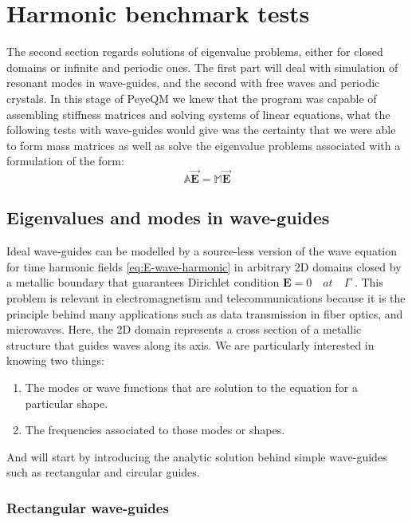 \section{Harmonic benchmark tests}
The second section regards solutions of eigenvalue problems, either for closed domains or infinite and periodic ones. The first part will deal with simulation of resonant modes in wave-guides, and the second with free waves and periodic crystals.
In this stage of PeyeQM we knew that the program was capable of assembling stiffness matrices and solving systems of linear equations, what the following tests with wave-guides would give was the certainty that we were able to form mass matrices as well  as solve the eigenvalue problems associated with a formulation of the form:
\[\mathbb{A}\mathbf{\vec{E}} = \mathbb{M}\mathbf{\vec{E}}\]


\subsection{Eigenvalues and modes in wave-guides}

Ideal wave-guides can be modelled by a source-less version of the wave equation for time harmonic fields \ref{eq:E-wave-harmonic} in arbitrary 2D domains closed by a metallic boundary that guarantees Dirichlet condition $\mathbf{E} = 0\quad at\quad \Gamma$ . This problem is relevant in electromagnetism and telecommunications because it is the principle behind many applications such as data transmission in fiber optics, and microwaves. Here, the 2D domain represents a cross section of a metallic structure that guides waves along its axis. We are particularly interested in knowing two things:
\begin{enumerate}
\item The modes or wave functions that are solution to the equation for a particular shape.
\item The frequencies associated to those modes or shapes. 
\end{enumerate}
And will start by introducing the analytic solution behind simple wave-guides such as rectangular and circular guides.

\subsubsection{Rectangular wave-guides} 

